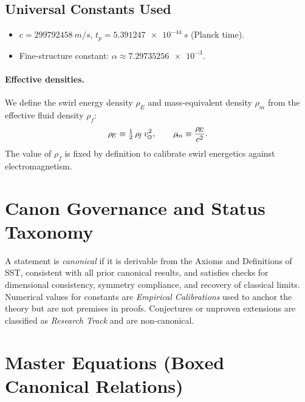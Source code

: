 \documentclass[11pt]{article}
\newcommand{\swirlarrow}{%
    \mathchoice{\mkern-2mu\scriptstyle\boldsymbol{\circlearrowleft}}%
    {\mkern-2mu\scriptstyle\boldsymbol{\circlearrowleft}}%
    {\mkern-2mu\scriptscriptstyle\boldsymbol{\circlearrowleft}}%
    {\mkern-2mu\scriptscriptstyle\boldsymbol{\circlearrowleft}}%
}
\newcommand{\vscore}{v_{\swirlarrow}}                    %
\newcommand{\rhof}{\rho_{\!f}}                           %
\newcommand{\rhoE}{\rho_{\!E}}                           %
\newcommand{\rhom}{\rho_{\!m}}                           %
\begin{document}
    \subsection*{Universal Constants Used}
        \begin{itemize}
        \item $c=\num{299792458}\ \si{m/s}$, \quad $t_p=\num{5.391247e-44}\ \si{s}$ (Planck time).
        \item Fine-structure constant: $\alpha \approx \num{7.29735256e-3}$.
        \end{itemize}

        \paragraph{Effective densities.} We define the swirl energy density $\rhoE$ and mass-equivalent density $\rhom$ from the effective fluid density $\rhof$:
            \[
                \rhoE \equiv \tfrac{1}{2}\,\rhof\,\vscore^2, \qquad
                \rhom \equiv \frac{\rhoE}{c^2}.
            \]
            The value of $\rhof$ is fixed by definition to calibrate swirl energetics against electromagnetism.

\section{Canon Governance and Status Taxonomy}
\label{sec:canon_governance}
A statement is \emph{canonical} if it is derivable from the Axioms and Definitions of SST, consistent with all prior canonical results, and satisfies checks for dimensional consistency, symmetry compliance, and recovery of classical limits. Numerical values for constants are \emph{Empirical Calibrations} used to anchor the theory but are not premises in proofs. Conjectures or unproven extensions are classified as \emph{Research Track} and are non-canonical.

\section{Master Equations (Boxed Canonical Relations)}
\label{sec:master_equations}
\end{document}
